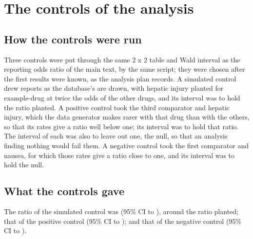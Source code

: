 \section{The controls of the analysis}

\subsection{How the controls were run}

Three controls were put through the same 2 x 2 table and Wald interval as the reporting odds
ratio of the main text, by the same script; they were chosen after the first results were
known, as the analysis plan records. A simulated control drew reports as the database's are
drawn, with hepatic injury planted for example-drug at twice the odds of the other drugs,
and its interval was to hold the ratio planted. A positive control took the third comparator
and hepatic injury, which the data generator makes rarer with that drug than with the
others, so that its rates give a ratio well below one; its interval was to hold that ratio.
The interval of each was also to leave out one, the null, so that an analysis finding
nothing would fail them. A negative control took the first comparator and nausea, for which
those rates give a ratio close to one, and its interval was to hold the
null. 

\subsection{What the controls gave}

The ratio of the simulated control was  (95\% CI
 to ), around the
ratio planted; that of the positive control  (95\% CI
 to ); and that of
the negative control  (95\% CI
 to ).
